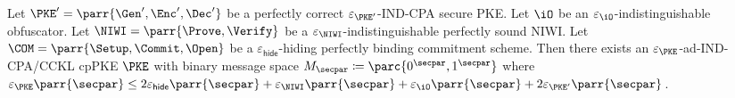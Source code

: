 \begin{theorem}
    Let \(\PKE' = \parr{\Gen',\Enc',\Dec'}\) be a perfectly correct \(\varepsilon_{\PKE'}\)-IND-CPA secure PKE.
    Let \(\iO\) be an \(\varepsilon_{\iO}\)-indistinguishable obfuscator.
    Let \(\NIWI = \parr{\Prove,\Verify}\) be a \(\varepsilon_{\NIWI}\)-indistinguishable perfectly sound NIWI.
    Let \(\COM = \parr{\Setup,\Commit,\Open}\) be a \(\varepsilon_{\textsf{hide}}\)-hiding perfectly binding commitment scheme.
    Then there exists an \(\varepsilon_{\PKE}\)-ad-IND-CPA/CCKL cpPKE \(\PKE\) with binary message space \(M_\secpar \coloneq \parc{0^\secpar,1^\secpar}\) where \(\varepsilon_{\PKE}\parr{\secpar} \leq 2\varepsilon_{\textsf{hide}}\parr{\secpar} + \varepsilon_{\NIWI}\parr{\secpar} + \varepsilon_{\iO}\parr{\secpar} + 2\varepsilon_{\PKE'}\parr{\secpar}\).
\end{theorem}

